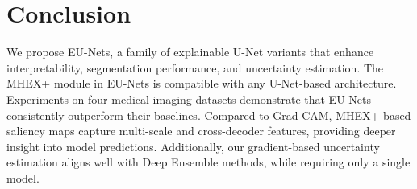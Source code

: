 \documentclass[runningheads]{llncs}
\begin{document}
\section{Conclusion}
We propose EU-Nets, a family of explainable U-Net variants that enhance interpretability, segmentation performance, and uncertainty estimation. The MHEX+ module in EU-Nets is compatible with any U-Net-based architecture. Experiments on four medical imaging datasets demonstrate that EU-Nets consistently outperform their baselines. Compared to Grad-CAM, MHEX+ based saliency maps capture multi-scale and cross-decoder features, providing deeper insight into model predictions. Additionally, our gradient-based uncertainty estimation aligns well with Deep Ensemble methods, while requiring only a single model.




\end{document}

